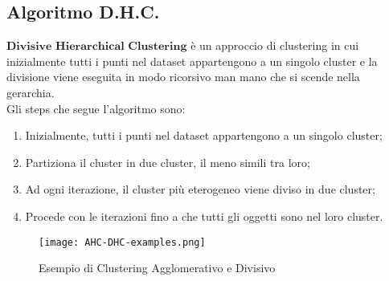 	\subsection{Algoritmo D.H.C.}
		$\textbf{Divisive Hierarchical Clustering}$ è un approccio di clustering in cui inizialmente tutti i punti nel dataset appartengono a un singolo cluster e la divisione viene eseguita in modo ricorsivo man mano che si scende nella gerarchia.
		\\[1\baselineskip]
		Gli steps che segue l'algoritmo sono:
			\begin{enumerate}
				\item Inizialmente, tutti i punti nel dataset appartengono a un singolo cluster;
				\item Partiziona il cluster in due cluster, il meno simili tra loro;
				\item Ad ogni iterazione, il cluster più eterogeneo viene diviso in due cluster;
				\item Procede con le iterazioni fino a che tutti gli oggetti sono nel loro cluster.
			\end{enumerate}
		
	\begin{figure}[h]
		\caption{Esempio di Clustering Agglomerativo e Divisivo}
		\centering
		\texttt{[image: AHC-DHC-examples.png]}
	\end{figure}

\clearpage